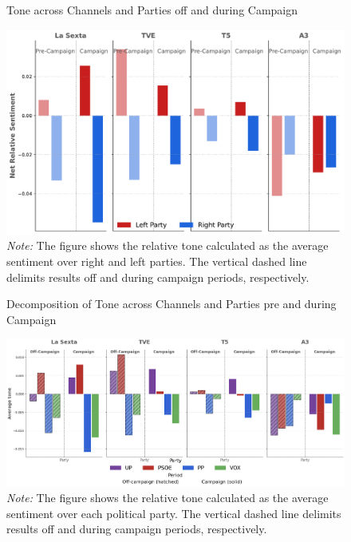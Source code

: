 \documentclass[12pt]{article}
\begin{document}
	
	
	
	\begin{figure}[!htb]
		\caption{Tone across Channels and Parties off and during Campaign }
		\centering
		\includegraphics[width=130mm]{figures/average_tone_pre_post_election}
		\caption*{\small \textit{Note:} The figure shows the relative tone calculated as the average sentiment over right and left parties. The vertical dashed line delimits results off and during campaign periods, respectively. }
		\label{fig:tone2}
	\end{figure}
	
	
	
	

	
	
	
	
	\begin{figure}[!htb]
		\caption{Decomposition of Tone across Channels and Parties pre and during Campaign }
		\centering
		\includegraphics[width=150mm]{figures/average_tone_pre_post_election_party.png}
		\caption*{\small \textit{Note:} The figure shows the relative tone calculated as the average sentiment over each political party. The vertical dashed line delimits results off and during campaign periods, respectively. }
		\label{fig:tone_by_party}
	\end{figure}
	
\end{document}

